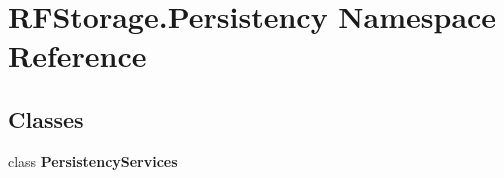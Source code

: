 \section{R\+F\+Storage.\+Persistency Namespace Reference}
\label{namespace_r_f_storage_1_1_persistency}
\subsection*{Classes}
\begin{DoxyCompactItemize}
\item 
class \textbf{ Persistency\+Services}
\end{DoxyCompactItemize}
